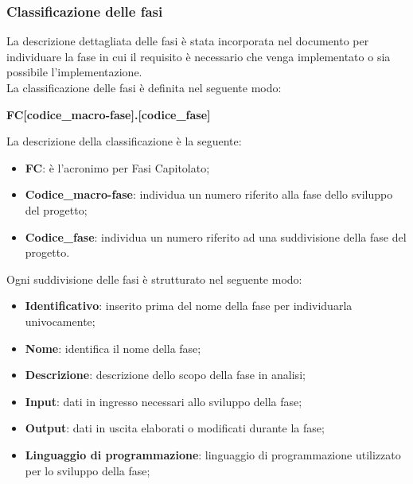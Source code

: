 \subsubsection{Classificazione delle fasi}\label{2.2.3.1.6}%
La descrizione dettagliata delle fasi è stata incorporata nel documento per individuare la fase in cui il requisito è necessario che venga implementato o sia possibile l'implementazione.\\
La classificazione delle fasi è definita nel seguente modo:
\begin{center}
	\textbf{FC[codice\_macro-fase].[codice\_fase]}
\end{center}
La descrizione della classificazione è la seguente:
\begin{itemize}
	\item \textbf{FC}: è l'acronimo per Fasi Capitolato;
	\item \textbf{Codice\_macro-fase}: individua un numero riferito alla fase dello sviluppo del progetto;
	\item \textbf{Codice\_fase}: individua un numero riferito ad una suddivisione della fase del progetto.
\end{itemize}
Ogni suddivisione delle fasi è strutturato nel seguente modo:
\begin{itemize}
	\item \textbf{Identificativo}: inserito prima del nome della fase per individuarla univocamente;
	\item \textbf{Nome}: identifica il nome della fase;
	\item \textbf{Descrizione}: descrizione dello scopo della fase in analisi;
	\item \textbf{Input}: dati in ingresso necessari allo sviluppo della fase;
	\item \textbf{Output}: dati in uscita elaborati o modificati durante la fase;
	\item \textbf{Linguaggio di programmazione}: linguaggio di programmazione utilizzato per lo sviluppo della fase;
\end{itemize}
